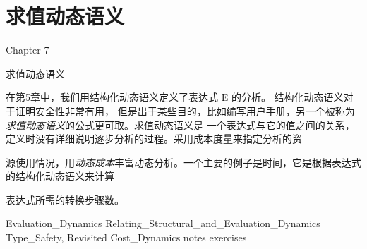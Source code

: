 \chapter{求值动态语义}%
Chapter 7

求值动态语义

在第5章中，我们用结构化动态语义定义了表达式 $\mathrm{E}$ 的分析。 结构化动态语义对于证明安全性非常有用，%
但是出于某些目的，比如编写用户手册，另一个被称为{\it 求值动态语义}的公式更可取。求值动态语义是
一个表达式与它的值之间的关系，定义时没有详细说明逐步分析的过程。采用成本度量来指定分析的资

源使用情况，用{\it 动态成本}丰富动态分析。一个主要的例子是时间，它是根据表达式的结构化动态语义来计算

表达式所需的转换步骤数。

{Evaluation_Dynamics}
{Relating_Structural_and_Evaluation_Dynamics}
{Type_Safety, Revisited}
{Cost_Dynamics}
{notes}
{exercises}






